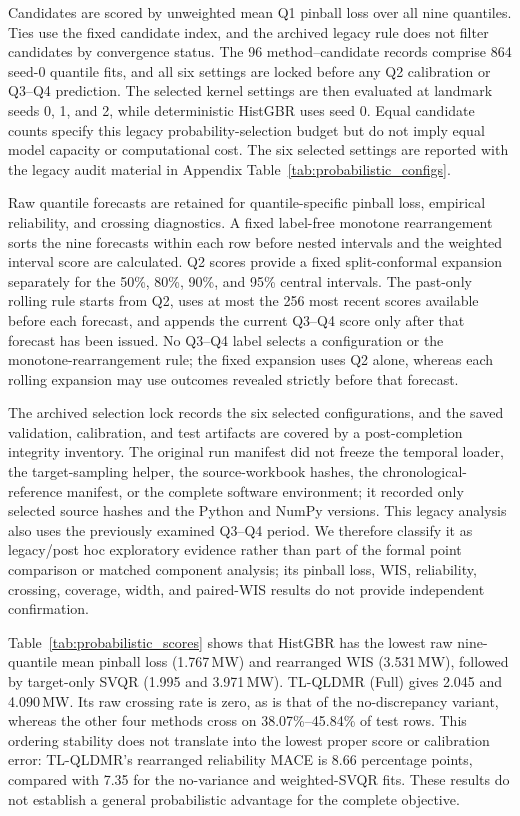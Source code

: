 {\color{blue}Candidates are scored by unweighted mean Q1 pinball loss over all nine quantiles. Ties use the fixed candidate index, and the archived legacy rule does not filter candidates by convergence status. The 96 method--candidate records comprise 864 seed-0 quantile fits, and all six settings are locked before any Q2 calibration or Q3--Q4 prediction. The selected kernel settings are then evaluated at landmark seeds 0, 1, and 2, while deterministic HistGBR uses seed 0. Equal candidate counts specify this legacy probability-selection budget but do not imply equal model capacity or computational cost. The six selected settings are reported with the legacy audit material in Appendix Table~\ref{tab:probabilistic_configs}.}

{\color{blue}Raw quantile forecasts are retained for quantile-specific pinball loss, empirical reliability, and crossing diagnostics. A fixed label-free monotone rearrangement sorts the nine forecasts within each row before nested intervals and the weighted interval score are calculated. Q2 scores provide a fixed split-conformal expansion separately for the 50\%, 80\%, 90\%, and 95\% central intervals. The past-only rolling rule starts from Q2, uses at most the 256 most recent scores available before each forecast, and appends the current Q3--Q4 score only after that forecast has been issued. No Q3--Q4 label selects a configuration or the monotone-rearrangement rule; the fixed expansion uses Q2 alone, whereas each rolling expansion may use outcomes revealed strictly before that forecast.}

{\color{blue}The archived selection lock records the six selected configurations, and the saved validation, calibration, and test artifacts are covered by a post-completion integrity inventory. The original run manifest did not freeze the temporal loader, the target-sampling helper, the source-workbook hashes, the chronological-reference manifest, or the complete software environment; it recorded only selected source hashes and the Python and NumPy versions. This legacy analysis also uses the previously examined Q3--Q4 period. We therefore classify it as legacy/post hoc exploratory evidence rather than part of the formal point comparison or matched component analysis; its pinball loss, WIS, reliability, crossing, coverage, width, and paired-WIS results do not provide independent confirmation.}

{\color{blue}Table~\ref{tab:probabilistic_scores} shows that HistGBR has the lowest raw nine-quantile mean pinball loss (1.767\,MW) and rearranged WIS (3.531\,MW), followed by target-only SVQR (1.995 and 3.971\,MW). TL-QLDMR (Full) gives 2.045 and 4.090\,MW. Its raw crossing rate is zero, as is that of the no-discrepancy variant, whereas the other four methods cross on 38.07\%--45.84\% of test rows. This ordering stability does not translate into the lowest proper score or calibration error: TL-QLDMR's rearranged reliability MACE is 8.66 percentage points, compared with 7.35 for the no-variance and weighted-SVQR fits. These results do not establish a general probabilistic advantage for the complete objective.}


